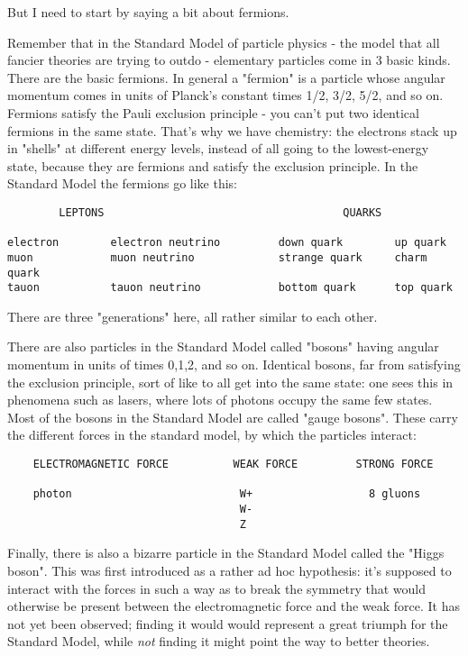 But I need to start by saying a bit about fermions.  

Remember that in the Standard Model of particle physics - the model
that all fancier theories are trying to outdo - elementary particles
come in 3 basic kinds.  There are the basic fermions.  In general a
"fermion" is a particle whose angular momentum comes in units of
Planck's constant \hbar  times 1/2, 3/2, 5/2, and so on.  Fermions satisfy
the Pauli exclusion principle - you can't put two identical fermions
in the same state.  That's why we have chemistry: the electrons stack up
in "shells" at different energy levels, instead of all going to the
lowest-energy state, because they are fermions and satisfy the exclusion
principle.  In the Standard Model the fermions go like this:

\begin{verbatim}
        LEPTONS                                     QUARKS

electron        electron neutrino         down quark        up quark
muon            muon neutrino             strange quark     charm quark
tauon           tauon neutrino            bottom quark      top quark

\end{verbatim}
    
There are three "generations" here, all rather similar to each other.  

There are also particles in the Standard Model called "bosons" having
angular momentum in units of \hbar  times 0,1,2, and so on.  Identical
bosons, far from satisfying the exclusion principle, sort of like to all
get into the same state: one sees this in phenomena such as lasers,
where lots of photons occupy the same few states.  Most of the bosons
in the Standard Model are called "gauge bosons".  These carry the 
different forces in the standard model, by which the particles interact:

\begin{verbatim}
    ELECTROMAGNETIC FORCE          WEAK FORCE         STRONG FORCE
        
    photon                          W+                  8 gluons 
                                    W-
                                    Z  

\end{verbatim}
    
Finally, there is also a bizarre particle in the Standard Model called the 
"Higgs boson".  This was first introduced as a rather ad hoc hypothesis:
it's supposed to interact with the forces in such a way as to break the
symmetry that would otherwise be present between the electromagnetic
force and the weak force.  It has not yet been observed; finding it would
would represent a great triumph for the Standard Model, while \emph{not}
finding it might point the way to better theories.  

